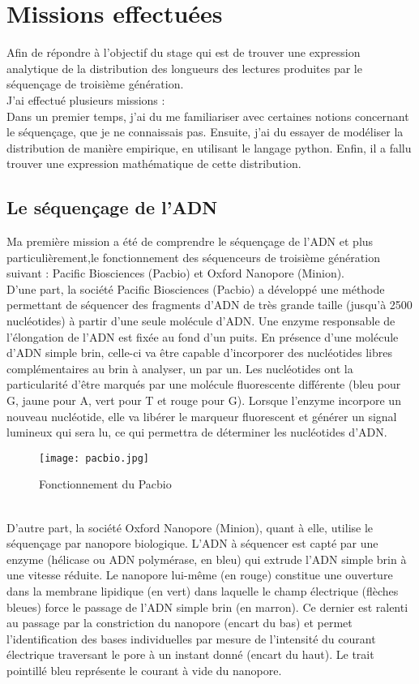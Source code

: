 \documentclass[11pt,a4paper]{article} %
\begin{document}
\section{Missions effectuées} 
Afin de répondre à l'objectif du stage qui est de trouver une expression analytique de la distribution des longueurs des lectures produites par le séquençage de troisième génération.\\
J'ai effectué plusieurs missions :\\
Dans un premier temps, j'ai du me familiariser avec certaines notions concernant le séquençage, que je ne connaissais pas. Ensuite, j'ai du essayer de modéliser la distribution de manière empirique, en utilisant le langage python. Enfin, il a fallu trouver une expression mathématique de cette distribution.\subsection{Le séquençage de l'ADN}
Ma première mission a été de comprendre le séquençage de l'ADN et plus particulièrement,le fonctionnement des séquenceurs de troisième génération suivant : Pacific Biosciences (Pacbio) et Oxford Nanopore (Minion).\\
D'une part, la société Pacific Biosciences (Pacbio) a développé une méthode permettant de séquencer des fragments d'ADN de très grande taille (jusqu'à 2500 nucléotides) à partir d'une seule molécule d'ADN. Une enzyme responsable de l'élongation de l'ADN est fixée au fond d'un puits. En présence d'une molécule d'ADN simple brin, celle-ci va être capable d'incorporer des nucléotides libres complémentaires au brin à analyser, un par un. Les nucléotides ont la particularité d'être marqués par une molécule fluorescente différente (bleu pour G, jaune pour A, vert pour T et rouge pour G). Lorsque l'enzyme incorpore un nouveau nucléotide, elle va libérer le marqueur fluorescent et générer un signal lumineux qui sera lu, ce qui permettra de déterminer les nucléotides d'ADN. \\
\begin{figure}[h]
  \centering
  \texttt{[image: pacbio.jpg]}
  \caption{\small Fonctionnement du Pacbio}
\end{figure} \\
D'autre part, la société Oxford Nanopore (Minion), quant à elle, utilise le séquençage par nanopore biologique. L’ADN à séquencer est capté par une enzyme (hélicase ou ADN polymérase, en bleu) qui extrude l’ADN simple brin à une vitesse réduite. Le nanopore lui-même (en rouge) constitue une ouverture dans la membrane lipidique (en vert) dans laquelle le champ électrique (flèches bleues) force le passage de l’ADN simple brin (en marron). Ce dernier est ralenti au passage par la constriction du nanopore (encart du bas) et permet l’identification des bases individuelles par mesure de l’intensité du courant électrique traversant le pore à un instant donné (encart du haut). Le trait pointillé bleu représente le courant à vide du nanopore. \\
\end{document}

